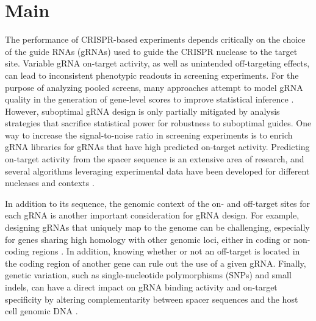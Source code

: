\documentclass[pdftex,english,10pt]{article}
\begin{document}
\section{Main}


The performance of CRISPR-based experiments depends critically on the choice of the guide RNAs (gRNAs) used to guide the CRISPR nuclease to the target site.
Variable gRNA on-target activity, as well as unintended off-targeting effects, can lead to inconsistent phenotypic readouts in screening experiments. 
For the purpose of analyzing pooled screens, many approaches attempt to model gRNA quality in the generation of gene-level scores to improve statistical inference \citep{ceres, bagel2, chronos, jacks, mageckmle}. However, suboptimal gRNA design is only partially mitigated by analysis strategies that sacrifice statistical power for robustness to suboptimal guides. One way to increase the signal-to-noise ratio in screening experiments is to enrich gRNA libraries for gRNAs that have high predicted on-target activity.  Predicting on-target activity from the spacer sequence is an extensive area of research, and several algorithms leveraging experimental data have been developed for different nucleases and contexts \citep{doench2016optimized, doench2014rational,azimuth,deepcas9, deepcpf1,toronto, crisprscan, crispria}. 

In addition to its sequence, the genomic context of the on- and off-target sites for each gRNA is another important consideration for gRNA design. For example, designing gRNAs that uniquely map to the genome can be challenging, especially for genes sharing high homology with other genomic loci, either in coding or non-coding regions \citep{fortin2019}. In addition, knowing whether or not an off-target is located in the coding region of another gene can rule out the use of a given gRNA. Finally, genetic variation, such as single-nucleotide polymorphisms (SNPs) and small indels, can have a direct impact on gRNA binding activity and on-target specificity by altering complementarity between spacer sequences and the host cell genomic DNA \citep{scott2017implications, lessard2017human, canver2017variant, wang2018genetic}.
\end{document}
